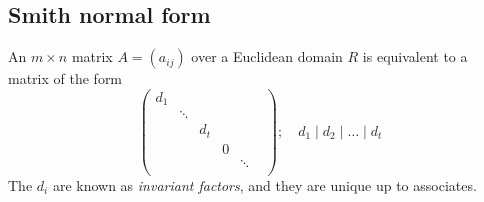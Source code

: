 \subsection{Smith normal form}
\begin{theorem}
	An \( m \times n \) matrix \( A = (a_{ij}) \) over a Euclidean domain \( R \) is equivalent to a matrix of the form
	\[
		\begin{pmatrix}
			d_1                            \\
			 & \ddots                      \\
			 &        & d_t                \\
			 &        &     & 0            \\
			 &        &     &   & \ddots   \\
			 &        &     &   &        &
		\end{pmatrix};\quad d_1 \mid d_2 \mid \dots \mid d_t
	\]
	The \( d_i \) are known as \textit{invariant factors}, and they are unique up to associates.
\end{theorem}

